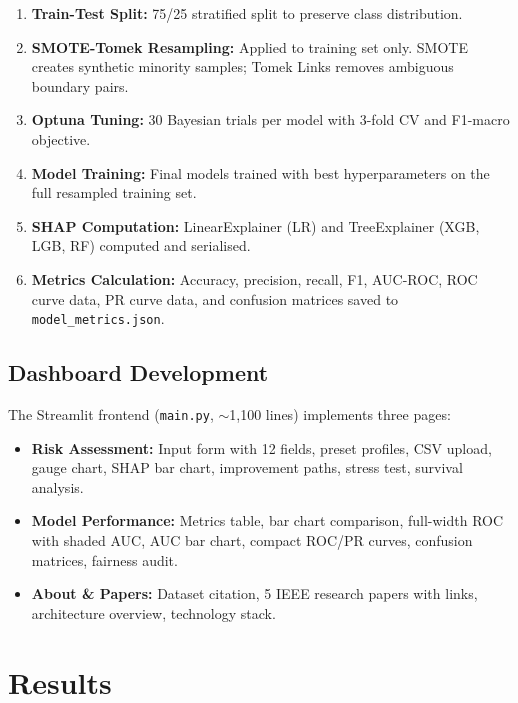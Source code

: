 \documentclass[12pt,a4paper]{report}
\begin{document}
\begin{enumerate}
    \item \textbf{Train-Test Split:} 75/25 stratified split to preserve class distribution.
    \item \textbf{SMOTE-Tomek Resampling:} Applied to training set only. SMOTE creates synthetic minority samples; Tomek Links removes ambiguous boundary pairs.
    \item \textbf{Optuna Tuning:} 30 Bayesian trials per model with 3-fold CV and F1-macro objective.
    \item \textbf{Model Training:} Final models trained with best hyperparameters on the full resampled training set.
    \item \textbf{SHAP Computation:} LinearExplainer (LR) and TreeExplainer (XGB, LGB, RF) computed and serialised.
    \item \textbf{Metrics Calculation:} Accuracy, precision, recall, F1, AUC-ROC, ROC curve data, PR curve data, and confusion matrices saved to \texttt{model\_metrics.json}.
\end{enumerate}

\section{Dashboard Development}

The Streamlit frontend (\texttt{main.py}, $\sim$1,100 lines) implements three pages:

\begin{itemize}
    \item \textbf{Risk Assessment:} Input form with 12 fields, preset profiles, CSV upload, gauge chart, SHAP bar chart, improvement paths, stress test, survival analysis.
    \item \textbf{Model Performance:} Metrics table, bar chart comparison, full-width ROC with shaded AUC, AUC bar chart, compact ROC/PR curves, confusion matrices, fairness audit.
    \item \textbf{About \& Papers:} Dataset citation, 5 IEEE research papers with links, architecture overview, technology stack.
\end{itemize}


\chapter{Results}
\end{document}
